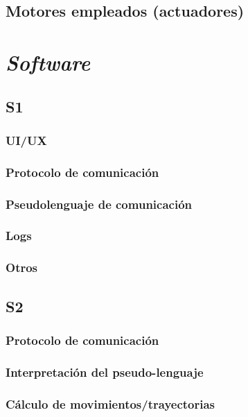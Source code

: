 \section{Motores empleados (actuadores)}


\chapter{\textit{Software}}

\section{S1}

\subsection{UI/UX}

\subsection{Protocolo de comunicación}

\subsection{Pseudolenguaje de comunicación}

\subsection{Logs}

\subsection{Otros}

\section{S2}

\subsection{Protocolo de comunicación}

\subsection{Interpretación del pseudo-lenguaje}

\subsection{Cálculo de movimientos/trayectorias}

